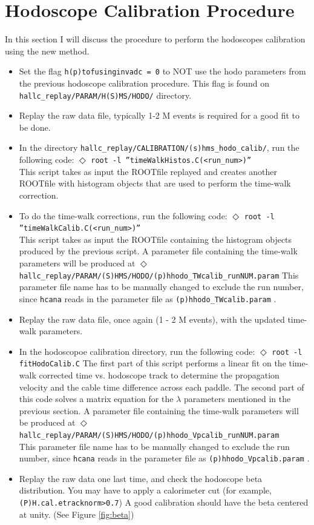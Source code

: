 \documentclass[14pt]{article}
\begin{document}
\renewcommand{\labelitemi}{$\blacksquare$}


\section{Hodoscope Calibration Procedure}
In this section I will discuss the procedure to perform the hodoscopes calibration
using the new method.
\begin{itemize}
\item Set the flag \texttt{h(p)tofusinginvadc = 0} to NOT use the hodo parameters from the
  previous hodoscope calibration procedure. This flag is found on \texttt{hallc\_replay/PARAM/H(S)MS/HODO/} directory.
\item Replay the raw data file, typically 1-2 M events is required for a good fit to be done.   
\item In the directory \texttt{hallc\_replay/CALIBRATION/(s)hms\_hodo\_calib/}, run the following code:
  \subitem $\Diamond$ {\texttt{root -l ''timeWalkHistos.C(<run\_num>)''} \\
  This script takes as input the ROOTfile replayed and creates another ROOTfile with histogram
  objects that are used to perform the time-walk correction.}
\item To do the time-walk corrections, run the following code:
  \subitem $\Diamond$ {\texttt{root -l ''timeWalkCalib.C(<run\_num>)''}} \\
  This script takes as input the ROOTfile containing the histogram objects produced by the previous
  script.  A parameter file containing the time-walk parameters will be produced at 
  \subitem $\Diamond$ {\texttt{hallc\_replay/PARAM/(S)HMS/HODO/(p)hhodo\_TWcalib\_runNUM.param}}
  This parameter file name has to be manually changed to exclude the run number, since \texttt{hcana} reads in the parameter file as
  \texttt{(p)hhodo\_TWcalib.param} .
\item Replay the raw data file, once again (1 - 2 M events), with the updated time-walk parameters.
\item In the hodoscopoe calibration directory, run the following code:
  \subitem $\Diamond$ {\texttt{root -l fitHodoCalib.C}}
  The first part of this script performs a linear fit on the time-walk corrected time vs. hodoscope track
  to determine the propagation velocity and the cable time difference across each paddle. The second part of
  this code solves a matrix equation for the $\lambda$ parameters mentioned in the previous section.
  A parameter file containing the time-walk parameters will be produced at
  \subitem $\Diamond$ {\texttt{hallc\_replay/PARAM/(S)HMS/HODO/(p)hhodo\_Vpcalib\_runNUM.param}} \\
  This parameter file name has to be manually changed to exclude the run number, since \texttt{hcana} reads in the parameter file as
  \texttt{(p)hhodo\_Vpcalib.param} .
\item {Replay the raw data one last time, and check the hodoscope beta distribution. You may have to apply a calorimeter cut (for example, \texttt{(P)H.cal.etracknorm>0.7})}
  A good calibration should have the beta centered at unity. (See Figure \ref{fig:beta})
\end{itemize}
\end{document}
